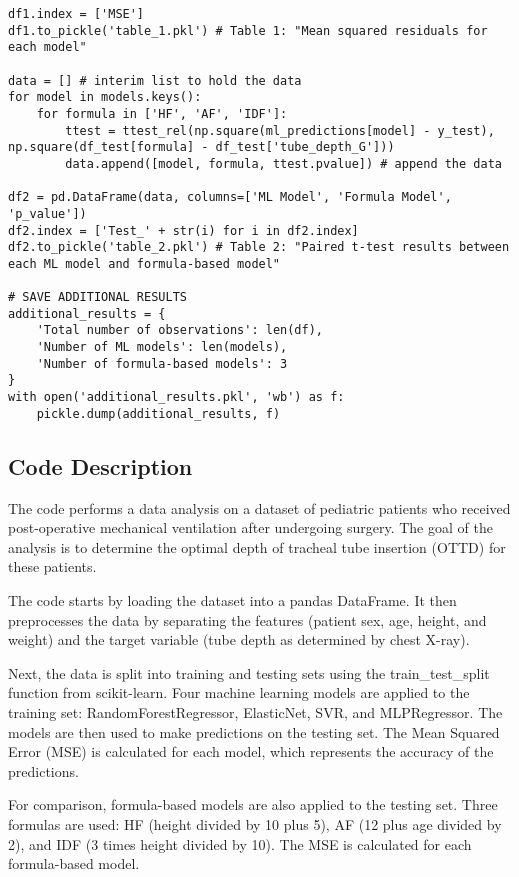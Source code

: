 \documentclass[11pt]{article}
\begin{document}
\begin{verbatim}
df1.index = ['MSE']
df1.to_pickle('table_1.pkl') # Table 1: "Mean squared residuals for each model"

data = [] # interim list to hold the data
for model in models.keys():
    for formula in ['HF', 'AF', 'IDF']:
        ttest = ttest_rel(np.square(ml_predictions[model] - y_test), np.square(df_test[formula] - df_test['tube_depth_G']))
        data.append([model, formula, ttest.pvalue]) # append the data

df2 = pd.DataFrame(data, columns=['ML Model', 'Formula Model', 'p_value'])
df2.index = ['Test_' + str(i) for i in df2.index]
df2.to_pickle('table_2.pkl') # Table 2: "Paired t-test results between each ML model and formula-based model"

# SAVE ADDITIONAL RESULTS
additional_results = {
    'Total number of observations': len(df),
    'Number of ML models': len(models),
    'Number of formula-based models': 3
}
with open('additional_results.pkl', 'wb') as f:
    pickle.dump(additional_results, f)

\end{verbatim}

\subsection{Code Description}

The code performs a data analysis on a dataset of pediatric patients who received post-operative mechanical ventilation after undergoing surgery. The goal of the analysis is to determine the optimal depth of tracheal tube insertion (OTTD) for these patients.

The code starts by loading the dataset into a pandas DataFrame. It then preprocesses the data by separating the features (patient sex, age, height, and weight) and the target variable (tube depth as determined by chest X-ray).

Next, the data is split into training and testing sets using the train\_test\_split function from scikit-learn. Four machine learning models are applied to the training set: RandomForestRegressor, ElasticNet, SVR, and MLPRegressor. The models are then used to make predictions on the testing set. The Mean Squared Error (MSE) is calculated for each model, which represents the accuracy of the predictions.

For comparison, formula-based models are also applied to the testing set. Three formulas are used: HF (height divided by 10 plus 5), AF (12 plus age divided by 2), and IDF (3 times height divided by 10). The MSE is calculated for each formula-based model.
\end{document}

